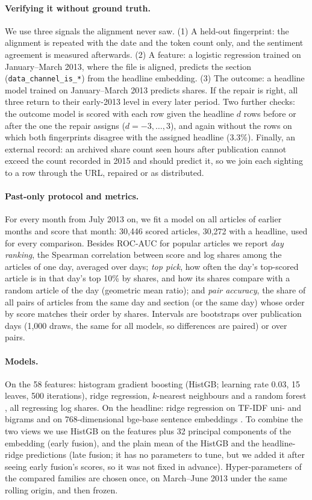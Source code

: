 \documentclass[10pt,a4paper,twocolumn]{article}
\begin{document}
\paragraph{Verifying it without ground truth.} We use three signals the alignment never saw. (1) A held-out
fingerprint: the alignment is repeated with the date and the token count only, and the sentiment agreement is
measured afterwards. (2) A feature: a logistic regression trained on January--March 2013, where the file is
aligned, predicts the section (\texttt{data\_channel\_is\_*}) from the headline embedding. (3) The outcome: a
headline model trained on January--March 2013 predicts shares. If the repair is right, all three return to their
early-2013 level in every later period. Two further checks: the outcome model is scored with each row given the
headline $d$ rows before or after the one the repair assigns ($d=-3,\dots,3$), and again without the rows on
which both fingerprints disagree with the assigned headline (3.3\%). Finally, an external record: an archived share count seen hours after publication cannot exceed the count
recorded in 2015 and should predict it, so we join each sighting to a row through the URL, repaired or as
distributed.

\paragraph{Past-only protocol and metrics.} For every month from July 2013 on, we fit a model on all articles of
earlier months and score that month: 30{,}446 scored articles, 30{,}272 with a headline, used for every
comparison. Besides ROC-AUC for popular articles we report \emph{day ranking}, the
Spearman correlation between score and log shares among the articles of one day, averaged over days; \emph{top
pick}, how often the day's top-scored article is in that day's top 10\% by shares, and how its shares compare
with a random article of the day (geometric mean ratio); and \emph{pair accuracy}, the share of all pairs of
articles from the same day and section (or the same day) whose order by score matches their order by shares.
Intervals are bootstraps over publication days (1{,}000 draws, the same for all models, so differences are
paired) or over pairs.

\paragraph{Models.} On the 58 features: histogram gradient boosting \citep{friedman2001,ke2017} (HistGB; learning
rate 0.03, 15 leaves, 500 iterations), ridge regression, $k$-nearest neighbours and a random forest
\citep{breiman2001}, all regressing log shares. On the headline: ridge regression on TF-IDF uni- and bigrams and
on 768-dimensional bge-base sentence embeddings \citep{xiao2024bge}. To combine the two views we use HistGB on
the features plus 32 principal components of the embedding (early fusion), and the plain mean of the HistGB and
the headline-ridge predictions (late fusion; it has no parameters to tune, but we added it after seeing early
fusion's scores, so it was not fixed in advance). Hyper-parameters of the compared families are
chosen once, on March--June 2013 under the same rolling origin, and then frozen.
\end{document}
